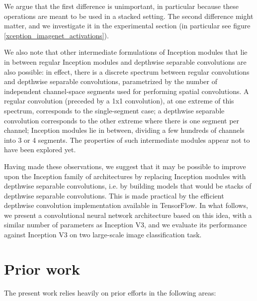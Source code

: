 We argue that the first difference is unimportant, in particular because these operations are meant to be used in a stacked setting. The second difference might matter, and we investigate it in the experimental section (in particular see figure \ref{xception_imagenet_activations}).

We also note that other intermediate formulations of Inception modules that lie in between regular Inception modules and depthwise separable convolutions are also possible: in effect, there is a discrete spectrum between regular convolutions and depthwise separable convolutions, parametrized by the number of independent channel-space segments used for performing spatial convolutions. A regular convolution (preceded by a 1x1 convolution), at one extreme of this spectrum, corresponds to the single-segment case; a depthwise separable convolution corresponds to the other extreme where there is one segment per channel; Inception modules lie in between, dividing a few hundreds of channels into 3 or 4 segments. The properties of such intermediate modules appear not to have been explored yet.

Having made these observations, we suggest that it may be possible to improve upon the Inception family of architectures by replacing Inception modules with depthwise separable convolutions, i.e. by building models that would be stacks of depthwise separable convolutions. This is made practical by the efficient depthwise convolution implementation available in TensorFlow. In what follows, we present a convolutional neural network architecture based on this idea, with a similar number of parameters as Inception V3, and we evaluate its performance against Inception V3 on two large-scale image classification task.

\section{Prior work}

The present work relies heavily on prior efforts in the following areas:

